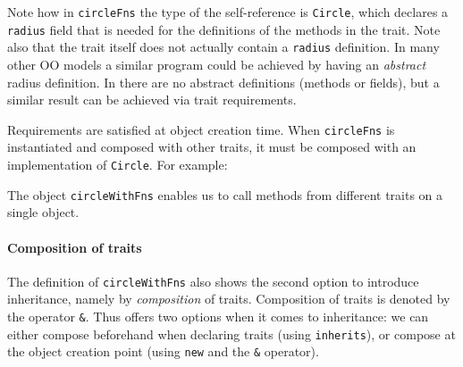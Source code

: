 \noindent Note how in \lstinline$circleFns$ the type of the self-reference is
\lstinline$Circle$, which declares a \lstinline{radius} field that is needed for
the definitions of the methods in the trait. Note also that the trait itself
does not actually contain a \lstinline{radius} definition. In many other OO
models a similar program could be achieved by having an \emph{abstract} radius
definition. In \name there are no abstract definitions (methods or fields), but
a similar result can be achieved via trait requirements.

Requirements are satisfied at object creation time. When \lstinline$circleFns$
is instantiated and composed with other traits, it must be composed with an
implementation of \lstinline$Circle$. For example:

The object \lstinline{circleWithFns} enables us to call
methods from different traits on a single object.

\paragraph{Composition of traits}
The definition of \lstinline{circleWithFns} also shows the second option to
introduce inheritance, namely by \textit{composition} of traits. Composition of
traits is denoted by the operator \lstinline{&}. Thus \name offers two options
when it comes to inheritance: we can either compose beforehand when declaring
traits (using \lstinline{inherits}), or compose at the object creation point
(using \lstinline{new} and the \lstinline{&} operator).

\begin{comment}
\paragraph{Mutually dependent traits} When two traits are composed, any two
methods in those two traits can refer to each other via the self-reference. We
say these two traits are \textit{mutually dependent}. The next example, though a
bit contrived, illustrates this point.

\noindent By utilizing trait requirements, the \lstinline{isEven} and
\lstinline{isOdd} methods can refer to each other in two different traits.
\end{comment}


